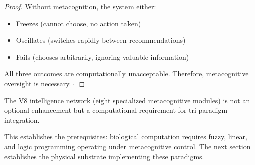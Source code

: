 \begin{proof}
Without metacognition, the system either:
\begin{itemize}
\item Freezes (cannot choose, no action taken)
\item Oscillates (switches rapidly between recommendations)
\item Fails (chooses arbitrarily, ignoring valuable information)
\end{itemize}

All three outcomes are computationally unacceptable. Therefore, metacognitive oversight is necessary. $\square$
\end{proof}

\begin{corollary}
The V8 intelligence network (eight specialized metacognitive modules) is not an optional enhancement but a computational requirement for tri-paradigm integration.
\end{corollary}

This establishes the prerequisites: biological computation requires fuzzy, linear, and logic programming operating under metacognitive control. The next section establishes the physical substrate implementing these paradigms.

